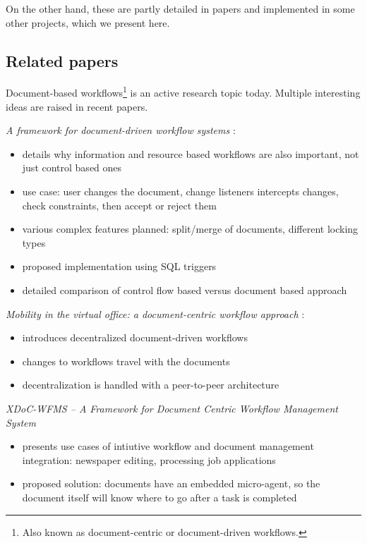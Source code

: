 On the other hand, these are partly detailed in papers and implemented in some
other projects, which we present here.

\subsection*{Related papers}

Document-based workflows\footnote{Also known as document-centric or
document-driven workflows.} is an active research topic today. Multiple
interesting ideas are raised in recent papers.

\emph{A framework for document-driven workflow systems} \cite{paper-framework}:
\begin{itemize}
\item details why information and resource based workflows are also important, not just control based ones
\item use case: user changes the document, change listeners intercepts changes, check constraints, then accept or reject them
\item various complex features planned: split/merge of documents, different locking types
\item proposed implementation using SQL triggers
\item detailed comparison of control flow based versus document based approach
\end{itemize}

\emph{Mobility in the virtual office: a document-centric workflow approach} \cite{paper-mobility}:
\begin{itemize}
\item introduces decentralized document-driven workflows
\item changes to workflows travel with the documents
\item decentralization is handled with a peer-to-peer architecture
\end{itemize}

\emph{XDoC-WFMS -- A Framework for Document Centric Workflow Management System} \cite{paper-xdoc}
\begin{itemize}
\item presents use cases of intiutive workflow and document management integration: newspaper editing, processing job applications
\item proposed solution: documents have an embedded micro-agent, so the document itself will know where to go after a task is completed
\end{itemize}

